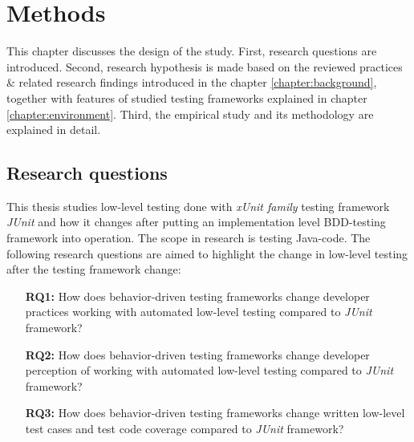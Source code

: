 \chapter{Methods}
\label{chapter:methods}
This chapter discusses the design of the study. First, research questions are introduced.
Second, research hypothesis is made based on the reviewed practices \& related research findings introduced in the chapter \ref{chapter:background},
together with features of studied testing frameworks explained in chapter \ref{chapter:environment}.
Third, the empirical study and its methodology are explained in detail.

\section{Research questions}
This thesis studies low-level testing done with \textit{xUnit family} testing framework	\textit{JUnit}  and how it changes after putting
an implementation level BDD-testing framework into operation. The scope in research is testing Java-code. The following
research questions are aimed to highlight the change in low-level testing after the testing framework change:
\begin{addmargin}[2em]{0em}
\vspace{20px}
\begin{itemize}
\item[\textbf{RQ1:}] How does behavior-driven testing frameworks change developer practices working with automated low-level testing compared to	\textit{JUnit}  framework?
\item[\textbf{RQ2:}] How does behavior-driven testing frameworks change developer perception of working with automated low-level testing compared to \textit{JUnit}  framework?
\item[\textbf{RQ3:}] How does behavior-driven testing frameworks change written low-level test cases and test code coverage compared to \textit{JUnit}  framework?
\end{itemize}
\end{addmargin}

